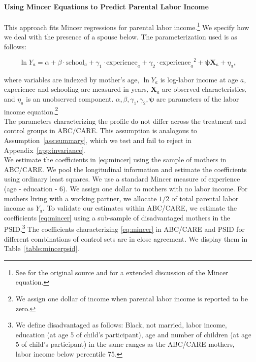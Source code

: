 \paragraph{Using Mincer Equations to Predict Parental Labor Income} \label{appendix:mincerpar}

\noindent This approach fits Mincer regressions for parental labor income.\footnote{See \citet{Mincer_1974_schooling} for the original source and \citet{Heckman_Lochner_ea_2006_HEE} for a extended discussion of the Mincer equation.} We specify how we deal with the presence of a spouse below. The parameterization used is as follows:

\begin{equation}
\ln Y_{a} = \alpha + \beta \cdot \text{school}_{a} + \gamma_{1}  \cdot \text{experience}_{a} + \gamma_{2} \cdot {\text{experience}_{a}}^2 + \bm{\psi} \mathbf{X}_{a} + \eta_{a}, \label{eq:mincer}
\end{equation}

\noindent where variables are indexed by mother's age, $\ln Y_a$ is log-labor income at age $a$, experience and schooling are measured in years, $ \mathbf{X}_{a}$ are observed characteristics, and $\eta_{a}$ is an unobserved component. $\alpha, \beta, \gamma_{1}, \gamma_{2}, \bm{\psi}$ are parameters of the labor income equation.\footnote{We assign one dollar of income when parental labor income is reported to be zero.}\\

\noindent The parameters characterizing the profile do not differ across the treatment and control groups in ABC/CARE. This assumption is analogous to Assumption~\ref{ass:summary}, which we test and fail to reject in Appendix~\ref{app:invariance}.\\

\noindent We estimate the coefficients in \eqref{eq:mincer} using the sample of mothers in ABC/CARE. We pool the longitudinal information and estimate the coefficients using ordinary least squares. We use a standard Mincer measure of experience (age - education - 6). We assign one dollar to mothers with no labor income. For mothers living with a working partner, we allocate $1/2$ of total parental labor income as $Y_{a}$. To validate our estimates within ABC/CARE, we estimate the coefficients \eqref{eq:mincer} using a sub-sample of disadvantaged mothers in the PSID.\footnote{We define disadvantaged as follows: Black, not married, labor income, education (at age 5 of child's participant), age and number of children (at age 5 of child's participant) in the same ranges as the ABC/CARE mothers, labor income below percentile 75.} The coefficients characterizing \eqref{eq:mincer} in ABC/CARE and PSID for different combinations of control sets are in close agreement. We display them in Table~\ref{table:mincerpsid}.\\

